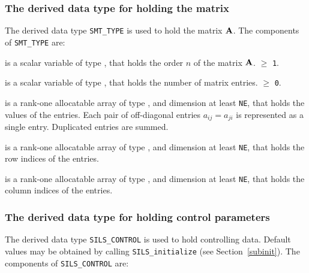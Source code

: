 \documentclass{galahad}
\newcommand{\packagename}{SILS}
\begin{document}

\subsubsection{The derived data type for holding the matrix}\label{typeprob}
The derived data type {\tt SMT\_TYPE} is used to hold the matrix ${\mathbf{A}}$. 
The components of {\tt SMT\_TYPE} are:

\begin{description}

 is a scalar variable of type \integer, that holds
the order $n$ of the matrix  ${\mathbf{A}}$. 
 $\geq$ {\tt 1}. 

 is a scalar variable of type \integer, that holds the 
number of matrix entries.  
 $\geq$ {\tt 0}.

 is a rank-one allocatable array of type \realdp, 
and dimension at least {\tt NE}, that holds the values of the entries. 
Each pair of off-diagonal entries $a_{ij} = a_{ji} $ 
is represented as a single entry. Duplicated entries are summed. 

 is a rank-one allocatable array of type \integer, 
and dimension at least {\tt NE}, that holds the row indices of the entries. 

 is a rank-one allocatable array of type \integer, 
and dimension at least {\tt NE}, that holds the column indices of the entries. 

\end{description}


\subsubsection{The derived data type for holding control 
 parameters}\label{typecontrol}
The derived data type 
{\tt \packagename\_CONTROL} 
is used to hold controlling data. Default values may be obtained by calling 
{\tt \packagename\_initialize}
(see Section~\ref{subinit}). The components of 
{\tt \packagename\_CONTROL} 
are:
\end{document}
